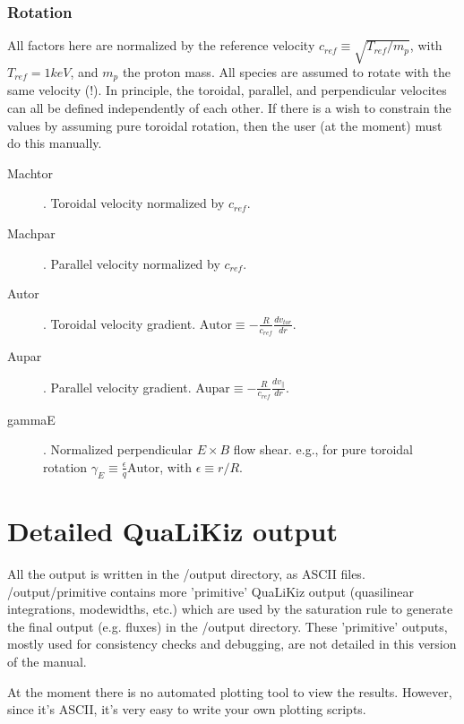 \documentclass{article}
\begin{document}
\subsubsection{Rotation}
All factors here are normalized by the reference velocity $c_{ref}\equiv\sqrt{T_{ref}/m_p}$, with $T_{ref}=1 keV$, and $m_p$ the proton mass. All species are assumed to rotate with the same velocity (!). In principle, the toroidal, parallel, and perpendicular velocites can all be defined independently of each other. If there is a wish to constrain the values by assuming pure toroidal rotation, then the user (at the moment) must do this manually. 
\begin{description}
\item[Machtor]. Toroidal velocity normalized by $c_{ref}$.
\item[Machpar]. Parallel velocity normalized by $c_{ref}$. 
\item[Autor]. Toroidal velocity gradient. $\mathrm{Autor}{\equiv}-\frac{R}{c_{ref}}\frac{dv_{tor}}{dr}$.
\item[Aupar]. Parallel velocity gradient. $\mathrm{Aupar}{\equiv}-\frac{R}{c_{ref}}\frac{dv_\parallel}{dr}$.
\item[gammaE]. Normalized perpendicular $E{\times}B$ flow shear. e.g., for pure toroidal rotation $\gamma_E{\equiv}\frac{\epsilon}{q}\mathrm{Autor}$, with $\epsilon{\equiv}r/R$.
\end{description}

\section{Detailed QuaLiKiz output}

All the output is written in the /output directory, as ASCII files. /output/primitive contains more 'primitive' QuaLiKiz output (quasilinear integrations, modewidths, etc.) which are used by the saturation rule to generate the final output (e.g. fluxes) in the /output directory. These 'primitive' outputs, mostly used for consistency checks and debugging, are not detailed in this version of the manual.

At the moment there is no automated plotting tool to view the results. However, since it's ASCII, it's very easy to write your own plotting scripts. 
\end{document}
